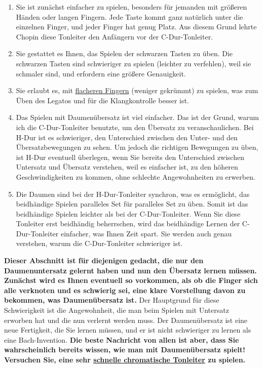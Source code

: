 \begin{enumerate}[label={\arabic*.}] 
\item Sie ist zunächst einfacher zu spielen, besonders für jemanden mit größeren Händen oder langen Fingern.
Jede Taste kommt ganz natürlich unter die einzelnen Finger, und jeder Finger hat genug Platz.
Aus diesem Grund lehrte Chopin diese Tonleiter den Anfängern vor der C-Dur-Tonleiter.
\item Sie gestattet es Ihnen, das Spielen der schwarzen Tasten zu üben.
Die schwarzen Tasten sind schwieriger zu spielen (leichter zu verfehlen), weil sie schmaler sind, und erfordern eine größere Genauigkeit.
\item Sie erlaubt es, mit \hyperlink{c1iii4b}{flacheren Fingern} (weniger gekrümmt) zu spielen, was zum Üben des Legatos und für die Klangkontrolle besser ist.
\item Das Spielen mit Daumenübersatz ist viel einfacher.
Das ist der Grund, warum ich die C-Dur-Tonleiter benutzte, um den Übersatz zu veranschaulichen.
Bei H-Dur ist es schwieriger, den Unterschied zwischen den Unter- und den Übersatzbewegungen zu sehen.
Um jedoch die richtigen Bewegungen zu üben, ist H-Dur eventuell überlegen, wenn Sie bereits den Unterschied zwischen Untersatz und Übersatz verstehen, weil es einfacher ist, zu den höheren Geschwindigkeiten zu kommen, ohne schlechte Angewohnheiten zu erwerben.
\item Die Daumen sind bei der H-Dur-Tonleiter synchron, was es ermöglicht, das beidhändige Spielen paralleles Set für paralleles Set zu üben.
Somit ist das beidhändige Spielen leichter als bei der C-Dur-Tonleiter.
Wenn Sie diese Tonleiter erst beidhändig beherrschen, wird das beidhändige Lernen der C-Dur-Tonleiter einfacher, was Ihnen Zeit spart.
Sie werden auch genau verstehen, warum die C-Dur-Tonleiter schwieriger ist.

 \end{enumerate}
\textbf{Dieser Abschnitt ist für diejenigen gedacht, die nur den Daumenuntersatz gelernt haben und nun den Übersatz lernen müssen.
Zunächst wird es Ihnen eventuell so vorkommen, als ob die Finger sich alle verknoten und es schwierig sei, eine klare Vorstellung davon zu bekommen, was Daumenübersatz ist.}
Der Hauptgrund für diese Schwierigkeit ist die Angewohnheit, die man beim Spielen mit Untersatz erworben hat und die nun verlernt werden muss.
Der Daumenübersatz ist eine neue Fertigkeit, die Sie lernen müssen, und er ist nicht schwieriger zu lernen als eine Bach-Invention.
\textbf{Die beste Nachricht von allen ist aber, dass Sie wahrscheinlich bereits wissen, wie man mit Daumenübersatz spielt!
Versuchen Sie, eine sehr \hyperlink{c1iii5h}{schnelle chromatische Tonleiter} zu spielen.}
